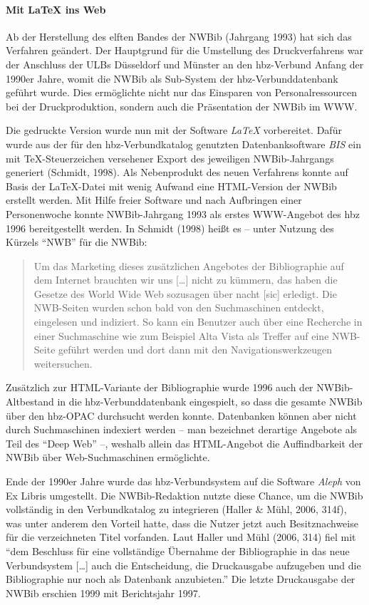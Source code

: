 \documentclass[a4paper,
fontsize=11pt,
oneside,
numbers=noperiodatend,
parskip=half-,
bibliography=totoc,
final
]{scrartcl}
\begin{document}
\paragraph{Mit LaTeX ins Web}\label{mit-latex-ins-web}

Ab der Herstellung des elften Bandes der NWBib (Jahrgang 1993) hat sich
das Verfahren geändert. Der Hauptgrund für die Umstellung des
Druckverfahrens war der Anschluss der ULBs Düsseldorf und Münster an den
hbz-Verbund Anfang der 1990er Jahre, womit die NWBib als Sub-System der
hbz-Verbunddatenbank geführt wurde. Dies ermöglichte nicht nur das
Einsparen von Personalressourcen bei der Druckproduktion, sondern auch
die Präsentation der NWBib im WWW.

Die gedruckte Version wurde nun mit der Software \emph{LaTeX}
vorbereitet. Dafür wurde aus der für den hbz-Verbundkatalog genutzten
Datenbanksoftware \emph{BIS} ein mit TeX-Steuerzeichen versehener Export
des jeweiligen NWBib-Jahrgangs generiert (Schmidt, 1998). Als
Nebenprodukt des neuen Verfahrens konnte auf Basis der LaTeX-Datei mit
wenig Aufwand eine HTML-Version der NWBib erstellt werden. Mit Hilfe
freier Software und nach Aufbringen einer Personenwoche konnte
NWBib-Jahrgang 1993 als erstes WWW-Angebot des hbz 1996 bereitgestellt
werden. In Schmidt (1998) heißt es -- unter Nutzung des Kürzels
\enquote{NWB} für die NWBib:

\begin{quote}
Um das Marketing dieses zusätzlichen Angebotes der Bibliographie auf dem
Internet brauchten wir uns {[}\ldots{}{]} nicht zu kümmern, das haben
die Gesetze des World Wide Web sozusagen über nacht {[}sic{]} erledigt.
Die NWB-Seiten wurden schon bald von den Suchmaschinen entdeckt,
eingelesen und indiziert. So kann ein Benutzer auch über eine Recherche
in einer Suchmaschine wie zum Beispiel Alta Vista als Treffer auf eine
NWB-Seite geführt werden und dort dann mit den Navigationswerkzeugen
weitersuchen.
\end{quote}

Zusätzlich zur HTML-Variante der Bibliographie wurde 1996 auch der
NWBib-Altbestand in die hbz-Verbunddatenbank eingespielt, so dass die
gesamte NWBib über den hbz-OPAC durchsucht werden konnte. Datenbanken
können aber nicht durch Suchmaschinen indexiert werden -- man bezeichnet
derartige Angebote als Teil des \enquote{Deep Web} --, weshalb allein
das HTML-Angebot die Auffindbarkeit der NWBib über Web-Suchmaschinen
ermöglichte.

Ende der 1990er Jahre wurde das hbz-Verbundsystem auf die Software
\emph{Aleph} von Ex Libris umgestellt. Die NWBib-Redaktion nutzte diese
Chance, um die NWBib vollständig in den Verbundkatalog zu integrieren
(Haller \& Mühl, 2006, 314f), was unter anderem den Vorteil hatte, dass
die Nutzer jetzt auch Besitznachweise für die verzeichneten Titel
vorfanden. Laut Haller und Mühl (2006, 314) fiel mit \enquote{dem
Beschluss für eine vollständige Übernahme der Bibliographie in das neue
Verbundsystem {[}\ldots{}{]} auch die Entscheidung, die Druckausgabe
aufzugeben und die Bibliographie nur noch als Datenbank anzubieten.} Die
letzte Druckausgabe der NWBib erschien 1999 mit Berichtsjahr 1997.
\end{document}
